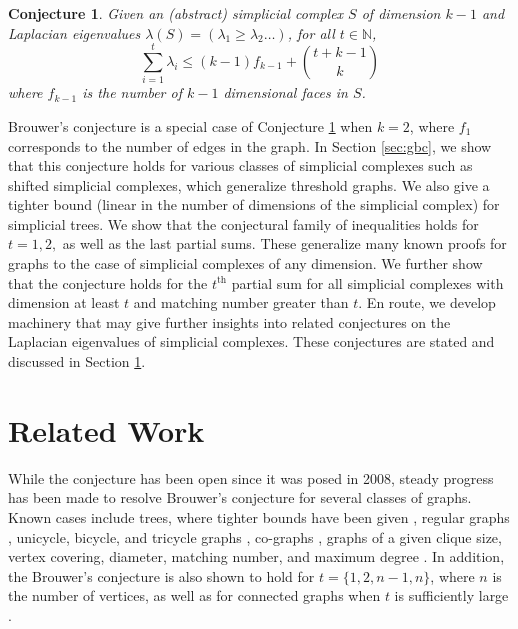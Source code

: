 \documentclass[11pt]{article}
\newtheorem{conj}[lm]{Conjecture}
\begin{document}
\begin{conj}
\label{red}
Given an (abstract) simplicial complex $S$ of dimension $k-1$ and Laplacian eigenvalues $\lambda(S) = \left( \lambda_1 \geq \lambda_2 \ldots \right)$, for all $t \in \mathbb{N}$,
\[ \sum_{i=1}^{t} \lambda_i \leq (k - 1) f_{k-1}+ \binom{t+k -1}{k}\]
where $f_{k-1}$ is the number of $k-1$ dimensional faces in $S$.
\end{conj}

Brouwer's conjecture is a special case of Conjecture \ref{red} when $k = 2$, where $f_1$ corresponds to the number of edges in the graph. In Section \ref{sec:gbc}, we show that this conjecture holds for various classes of simplicial complexes such as shifted simplicial complexes, which generalize threshold graphs. We also give a tighter bound (linear in the number of dimensions of the simplicial complex) for simplicial trees. We show that the conjectural family of inequalities holds for $t = 1, 2,$ as well as the last partial sums. These generalize many known proofs for graphs to the case of simplicial complexes of any dimension. We further show that the conjecture holds for the $t^{\text{th}}$ partial sum for all simplicial complexes with dimension at least $t$ and matching number greater than $t$. En route, we develop machinery that may give further insights into related conjectures on the Laplacian eigenvalues of simplicial complexes. These conjectures are stated and discussed in Section \ref{sec:related}. 




\section{Related Work}\label{sec:related}

While the conjecture has been open since it was posed in 2008, steady progress has been made to resolve Brouwer's conjecture for several classes of graphs. Known cases include trees, where tighter bounds have been given \cite{tree2,GZW,H}, regular graphs \cite{M}, unicycle, bicycle, and tricycle graphs \cite{DZ,WHL,YY}, co-graphs \cite{M}, graphs of a given clique size, vertex covering, diameter, matching number, and maximum degree \cite{CLF,DMG,DZ,G2,RV}.
In addition, the Brouwer's conjecture is also shown to hold for $t = \{1, 2, n-1, n\}$, where $n$ is the number of vertices, as well as for connected graphs when $t$ is sufficiently large \cite{C2,H,YY}.
\end{document}
